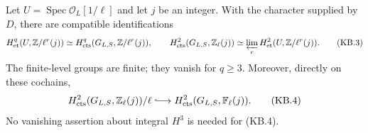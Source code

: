 \begin{proposition}
\label{claim:KB1}
Let $U=\operatorname{Spec}\mathcal O_L[1/\ell]$ and let $j$ be an
integer.  With the character supplied by $D$, there are compatible
identifications
\[
 H^q_{\rm et}(U,\mathbb Z/\ell^r(j))
       \simeq H^q_{\rm cts}(G_{L,S},\mathbb Z/\ell^r(j)),
 \qquad
 H^2_{\rm cts}(G_{L,S},\mathbb Z_\ell(j))
       \simeq\varprojlim_r H^2_{\rm et}(U,\mathbb Z/\ell^r(j)).
 \tag{KB.3}
\]
The finite-level groups are finite; they vanish for $q\ge3$.
Moreover, directly on these cochains,
\[
 H^2_{\rm cts}(G_{L,S},\mathbb Z_\ell(j))/\ell
       \lhook\joinrel\longrightarrow
 H^2_{\rm cts}(G_{L,S},\mathbb F_\ell(j)).
 \tag{KB.4}
\]
No vanishing assertion about integral $H^3$ is needed for (KB.4).
\end{proposition}

